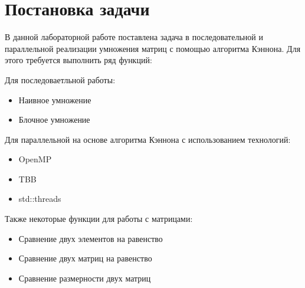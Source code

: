 \documentclass{report}
\begin{document}
\section{\hspace{0.6cm}Постановка задачи}
В данной лабораторной работе поставлена задача в последовательной и параллельной реализации умножения матриц  с помощью алгоритма Кэннона. Для этого требуется выполнить ряд функций:
\par Для последоваетльной работы:
\begin{itemize}
\item Наивное умножение
\item Блочное умножение
\end{itemize}
\par Для параллельной на основе алгоритма Кэннона с использованием технологий:
\begin{itemize}
\item OpenMP
\item TBB
\item std::threads
\end{itemize}
\par Также некоторые функции для работы с матрицами:
\begin{itemize}
\item Сравнение двух элементов на равенство
\item Сравнение двух матриц на равенство
\item Сравнение размерности двух матриц
\end{itemize}

\newpage
\end{document}
